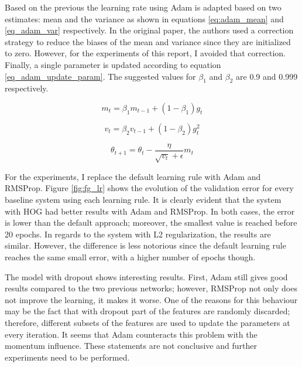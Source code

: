 \documentclass{article}
\begin{document}
Based on the previous the learning rate using Adam is adapted based on two estimates: mean and the variance as shown in equations \ref{eq:adam_mean} and \ref{eq_adam_var} respectively. In the original paper, the authors used a correction strategy to reduce the biases of the mean and variance since they are initialized to zero. However, for the experiments of this report, I avoided that correction. Finally, a single parameter is updated according to equation \ref{eq_adam_update_param}. The suggested values for $\beta_1$ and $\beta_2$ are 0.9 and 0.999 respectively.

\begin{equation}
	m_t = \beta_1 m_{t-1} + (1 - \beta_1) g_t
	\label{eq:adam_mean}
\end{equation}

\begin{equation}
	v_t = \beta_2 v_{t-1} + (1 - \beta_2) g_t^2
	\label{eq_adam_var}
\end{equation}

\begin{equation}
	\theta_{t+1} = \theta_t - \frac{\eta}{\sqrt{v_t} + \epsilon} m_t
	\label{eq_adam_update_param}
\end{equation}

For the experiments, I replace the default learning rule with Adam and RMSProp. Figure \ref{fig:fg_lr} shows the evolution of the validation error for every baseline system using each learning rule. It is clearly evident that the system with HOG had better results with Adam and RMSProp. In both cases, the error is lower than the default approach; moreover, the smallest value is reached before 20 epochs. In regards to the system with L2 regularization, the results are similar. However, the difference is less notorious since the default learning rule reaches the same small error, with a higher number of epochs though. 

The model with dropout shows interesting results. First, Adam still gives good results compared to the two previous networks; however, RMSProp not only does not improve the learning, it makes it worse. One of the reasons for this behaviour may be the fact that with dropout part of the features are randomly discarded; therefore, different subsets of the features are used to update the parameters at every iteration. It seems that Adam counteracts this problem with the momentum influence. These statements are not conclusive and further experiments need to be performed.
\end{document}
